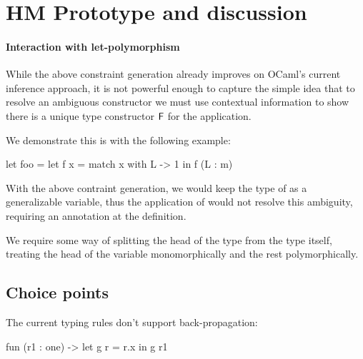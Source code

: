 \documentclass[acmsmall,screen,nonacm]{acmart}
\begin{document}





\section{HM Prototype and discussion}
\label{sec:implementation}





\paragraph{Interaction with let-polymorphism}


While the above constraint generation already improves on
OCaml's current inference approach, it is not powerful enough to capture the
simple idea that to resolve an ambiguous constructor we must use contextual
information to show there is a unique type constructor $\mathrel{\mathsf{F}}\mathclose{}$ for the
application.

We demonstrate this is with the following example:
\begin{program}
let foo =
  let f x = match x with L -> 1 in
  f (L : m)
\end{program}
With the above contraint generation, we would keep the type of 
as a generalizable variable, thus the application of  would not
resolve this ambiguity, requiring an annotation at the definition.

We require some way of splitting the head of the type from the type itself,
treating the head of the variable monomorphically and the rest
polymorphically.

\subsection{Choice points}

The current typing rules don't support back-propagation:

\begin{program}
fun (r1 : one) ->
  let g r = r.x in
  g r1
\end{program}
\end{document}
